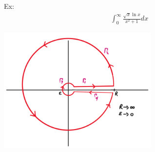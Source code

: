 Ex:
\begin{align*}
    &\int_0^\infty\frac{\sqrt{x}\ln x}{x^2+1}dx
\end{align*}
\centerline{\includegraphics[width=0.6\textwidth]{Images/ComplexAnalysisPictures/KeyHole.png}}
